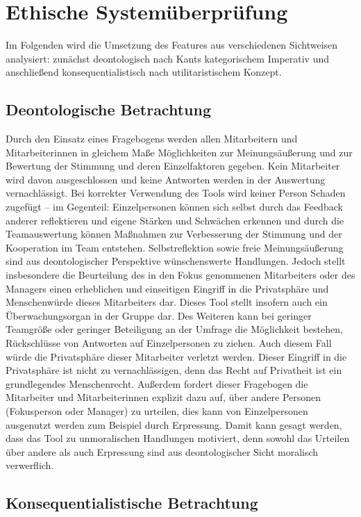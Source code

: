 \documentclass[a4paper,12pt,]{article}
\begin{document}
\section{Ethische Systemüberprüfung}

Im Folgenden wird die Umsetzung des Features aus verschiedenen
Sichtweisen analysiert: zunächst deontologisch nach Kants kategorischem
Imperativ und anschließend konsequentialistisch nach utilitaristischem
Konzept.

\subsection{Deontologische Betrachtung}

Durch den Einsatz eines Fragebogens werden allen Mitarbeitern und Mitarbeiterinnen in gleichem Maße Möglichkeiten zur Meinungsäußerung und zur Bewertung der Stimmung und deren Einzelfaktoren gegeben. Kein Mitarbeiter wird davon ausgeschlossen und keine Antworten werden in der Auswertung vernachlässigt. Bei korrekter Verwendung des Tools wird keiner Person Schaden zugefügt – im Gegenteil: Einzelpersonen können sich selbst durch das Feedback anderer reflektieren und eigene Stärken und Schwächen erkennen und durch die Teamauswertung können Maßnahmen zur Verbesserung der Stimmung und der Kooperation im Team entstehen. Selbstreflektion sowie freie Meinungsäußerung sind aus deontologischer Perspektive wünschenswerte Handlungen.
Jedoch stellt insbesondere die Beurteilung des in den Fokus genommenen Mitarbeiters oder des Managers einen erheblichen und einseitigen Eingriff in die Privatsphäre und Menschenwürde dieses Mitarbeiters dar. Dieses Tool stellt insofern auch ein Überwachungsorgan in der Gruppe dar. Des Weiteren kann bei geringer Teamgröße oder geringer Beteiligung an der Umfrage die Möglichkeit bestehen, Rückschlüsse von Antworten auf Einzelpersonen zu ziehen. Auch diesem Fall würde die Privatsphäre dieser Mitarbeiter verletzt werden. Dieser Eingriff in die Privatsphäre ist nicht zu vernachlässigen, denn das Recht auf Privatheit ist ein grundlegendes Menschenrecht.
Außerdem fordert dieser Fragebogen die Mitarbeiter und Mitarbeiterinnen explizit dazu auf, über andere Personen (Fokusperson oder Manager) zu urteilen, dies kann von Einzelpersonen ausgenutzt werden zum Beispiel durch Erpressung. Damit kann gesagt werden, dass das Tool zu unmoralischen Handlungen motiviert, denn sowohl das Urteilen über andere als auch Erpressung sind aus deontologischer Sicht moralisch verwerflich.


\subsection{Konsequentialistische Betrachtung}
\end{document}
